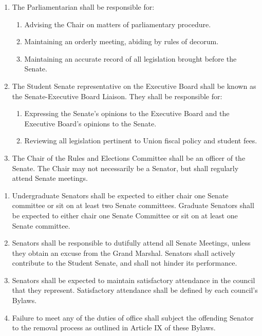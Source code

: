 \documentclass{bylaws}
\begin{document}
\begin{enumerate}
\item The Parliamentarian shall be responsible for:
\begin{enumerate}
\item Advising the Chair on matters of parliamentary procedure.
\item Maintaining an orderly meeting, abiding by rules of decorum.
\item Maintaining an accurate record of all legislation brought before the Senate.
\end{enumerate}

\item The Student Senate representative on the Executive Board shall be known as the Senate-Executive Board Liaison. They shall be
responsible for:
\begin{enumerate}
\item Expressing the Senate’s opinions to the Executive Board and the Executive Board’s opinions to the Senate.
\item Reviewing all legislation pertinent to Union fiscal policy and student fees.
\end{enumerate}
\item The Chair of the Rules and Elections Committee shall be an officer of the Senate. The Chair may not necessarily be a Senator,
but shall regularly attend Senate meetings. 
\end{enumerate}


\begin{enumerate}
\item Undergraduate Senators shall be expected to either chair one Senate committee or sit on at least two Senate committees.
Graduate Senators shall be expected to either chair one Senate Committee or sit on at least one Senate committee.
\item Senators shall be responsible to dutifully attend all Senate Meetings, unless they obtain an excuse from the Grand Marshal.
Senators shall actively contribute to the Student Senate, and shall not hinder its performance.
\item Senators shall be expected to maintain satisfactory attendance in the council that they represent. Satisfactory attendance shall
be defined by each council’s Bylaws.
\item Failure to meet any of the duties of office shall subject the offending Senator to the removal process as outlined in Article IX of
these Bylaws.
\end{enumerate}
\end{document}
